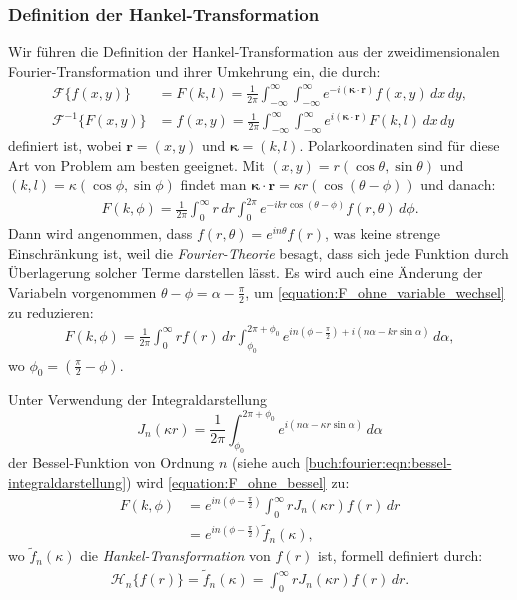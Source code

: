 \subsubsection{Definition der Hankel-Transformation
\label{subsub:hankel_tansformation}}
Wir führen die Definition der Hankel-Transformation
\cite{lokenath_debnath_integral_2015} aus der zweidimensionalen
Fourier-Trans\-formation und ihrer Umkehrung ein, die durch:
\begin{align}
	\mathscr{F}\{f(x,y)\}
	&=
	F(k,l)
	=
	\frac{1}{2\pi}\int_{-\infty}^{\infty}\int_{-\infty}^{\infty}e^{-i( \bm{\kappa}\cdot \mathbf{r})}f(x,y) \, dx \, dy,
	\label{equation:fourier_transform}
	\\
	\mathscr{F}^{-1}\{F(x,y)\}
	&=
	f(x,y)
	=
	\frac{1}{2\pi}\int_{-\infty}^{\infty}\int_{-\infty}^{\infty}e^{i(\bm{\kappa}\cdot \mathbf{r})}F(k,l) \, dx \, dy
	\label{equation:inv_fourier_transform}
\end{align}
definiert ist, wobei $\mathbf{r}=(x,y)$ und $\bm{\kappa}=(k,l)$.
Polarkoordinaten sind für diese Art von Problem am besten geeignet.
Mit $(x,y)=r(\cos\theta,\sin\theta)$ und $(k,l)=\kappa(\cos\phi,\sin\phi)$ findet man $\bm{\kappa}\cdot\mathbf{r}=\kappa r(\cos(\theta-\phi))$ und danach:
\begin{align}
	F(k,\phi)
	=
	\frac{1}{2\pi}\int_{0}^{\infty}r \, dr \int_{0}^{2\pi}e^{-ikr\cos(\theta-\phi)}f(r,\theta) \, d\phi.
	\label{equation:F_ohne_variable_wechsel}
\end{align}
Dann wird angenommen, dass $f(r,\theta)=e^{in\theta}f(r)$, was keine
strenge Einschränkung ist, weil die {\em Fourier-Theorie} besagt,
dass sich jede Funktion durch Überlagerung solcher Terme darstellen lässt.
Es wird auch eine Änderung der Variabeln vorgenommen
$\theta-\phi=\alpha-\frac{\pi}{2}$, um
\eqref{equation:F_ohne_variable_wechsel} zu reduzieren:
\begin{align}
	F(k,\phi)
	=
	\frac{1}{2\pi}\int_{0}^{\infty}rf(r) \, dr \int_{\phi_{0}}^{2\pi+\phi_{0}}e^{in(\phi-\frac{\pi}{2})+i(n\alpha-kr\sin\alpha)} \, d\alpha,
	\label{equation:F_ohne_bessel}
\end{align}
wo $\phi_{0}=(\frac{\pi}{2}-\phi)$.

Unter Verwendung der Integraldarstellung
\begin{equation*}
	J_n(\kappa r)=\frac{1}{2\pi}\int_{\phi_{0}}^{2\pi + \phi_{0}}e^{i(n\alpha-\kappa r \sin \alpha)} \, d\alpha
	\label{equation:bessel_n_ordnung}
\end{equation*}
der Bessel-Funktion
von Ordnung $n$
(siehe auch \eqref{buch:fourier:eqn:bessel-integraldarstellung})
wird
\eqref{equation:F_ohne_bessel} zu:
\begin{align}
	F(k,\phi)&=e^{in(\phi-\frac{\pi}{2})}\int_{0}^{\infty}rJ_n(\kappa r) f(r) \, dr  \nonumber \\ 
	&=
	e^{in(\phi-\frac{\pi}{2})}\tilde{f}_n(\kappa),
	\label{equation:F_mit_bessel_step_2}
\end{align}
wo $\tilde{f}_n(\kappa)$ die {\em Hankel-Transformation} von $f(r)$ ist,
formell definiert durch:
\begin{align}
	\mathscr{H}_n\{f(r)\}
	=
	\tilde{f}_n(\kappa)=\int_{0}^{\infty}rJ_n(\kappa r) f(r) \, dr.
	\label{equation:hankel}
\end{align}

